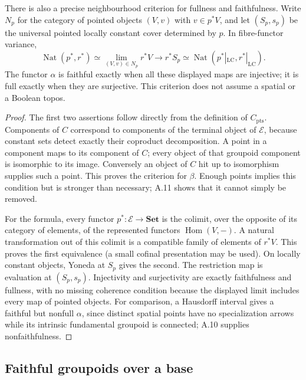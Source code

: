 There is also a precise neighbourhood criterion for fullness and faithfulness. Write $N_p$ for the category of pointed objects $(V,v)$ with $v\in p^*V$, and let $(S_p,s_p)$ be the universal pointed locally constant cover determined by $p$. In fibre-functor variance,
\[
 \operatorname{Nat}(p^*,r^*)
  \simeq\lim_{(V,v)\in N_p}r^*V
  \longrightarrow r^*S_p
  \simeq\operatorname{Nat}(p^*|_{\mathrm{LC}},r^*|_{\mathrm{LC}}).
\]
The functor $\alpha$ is faithful exactly when all these displayed maps are injective; it is full exactly when they are surjective. This criterion does not assume a spatial or a Boolean topos.
\begin{proof}
The first two assertions follow directly from the definition of $C_{\mathrm{pts}}$. Components of $C$ correspond to components of the terminal object of $\mathcal E$, because constant sets detect exactly their coproduct decomposition. A point in a component maps to its component of $C$; every object of that groupoid component is isomorphic to its image. Conversely an object of $C$ hit up to isomorphism supplies such a point. This proves the criterion for $\beta$. Enough points implies this condition but is stronger than necessary; A.11 shows that it cannot simply be removed.

For the formula, every functor $p^*:\mathcal E\to\mathbf{Set}$ is the colimit, over the opposite of its category of elements, of the represented functors $\operatorname{Hom}(V,-)$. A natural transformation out of this colimit is a compatible family of elements of $r^*V$. This proves the first equivalence (a small cofinal presentation may be used). On locally constant objects, Yoneda at $S_p$ gives the second. The restriction map is evaluation at $(S_p,s_p)$. Injectivity and surjectivity are exactly faithfulness and fullness, with no missing coherence condition because the displayed limit includes every map of pointed objects. For comparison, a Hausdorff interval gives a faithful but nonfull $\alpha$, since distinct spatial points have no specialization arrows while its intrinsic fundamental groupoid is connected; A.10 supplies nonfaithfulness. 
\end{proof}

\subsection{Faithful groupoids over a base}


